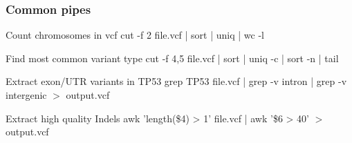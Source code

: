 \documentclass[]{beamer}
\begin{document}
\begin{frame}
\frametitle{Common pipes}

\begin{block}{Count chromosomes in vcf}
cut -f 2 file.vcf | sort | uniq | wc -l 
\end{block}

\pause

\begin{block}{Find most common variant type}
cut -f 4,5 file.vcf | sort | uniq -c | sort -n | tail 
\end{block}

\pause

\begin{block}{Extract exon/UTR variants in TP53}
grep TP53 file.vcf | grep -v intron | grep -v intergenic $>$ output.vcf 
\end{block}

\pause

\begin{block}{Extract high quality Indels}
awk 'length(\$4) > 1' file.vcf | awk '\$6 > 40' $>$ output.vcf 
\end{block}

\end{frame}
\end{document}
